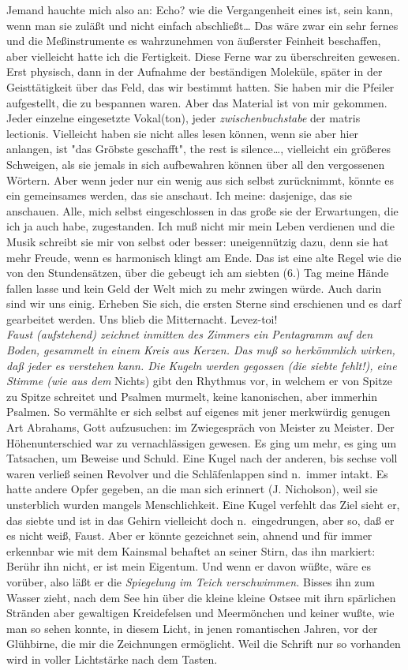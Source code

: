 \documentclass[
]{article}
\begin{document}
Jemand hauchte mich also an: Echo? wie die Vergangenheit eines ist, sein
kann, wenn man sie zuläßt und nicht einfach abschließt\ldots{} Das wäre
zwar ein sehr fernes und die Meßinstrumente es wahrzunehmen von
äußerster Feinheit beschaffen, aber vielleicht hatte ich die Fertigkeit.
Diese Ferne war zu überschreiten gewesen. Erst physisch, dann in der
Aufnahme der beständigen Moleküle, später in der Geisttätigkeit über das
Feld, das wir bestimmt hatten. Sie haben mir die Pfeiler aufgestellt,
die zu bespannen waren. Aber das Material ist von mir gekommen. Jeder
einzelne eingesetzte Vokal(ton), jeder \emph{zwischenbuchstabe} der
matris lectionis. Vielleicht haben sie nicht alles lesen können, wenn
sie aber hier anlangen, ist "das Gröbste geschafft", the rest is
silence\ldots, vielleicht ein größeres Schweigen, als sie jemals in sich
aufbewahren können über all den vergossenen Wörtern. Aber wenn jeder nur
ein wenig aus sich selbst zurücknimmt, könnte es ein gemeinsames werden,
das sie anschaut. Ich meine: dasjenige, das sie anschauen. Alle, mich
selbst eingeschlossen in das große sie der Erwartungen, die ich ja auch
habe, zugestanden. Ich muß nicht mir mein Leben verdienen und die Musik
schreibt sie mir von selbst oder besser: uneigennützig dazu, denn sie
hat mehr Freude, wenn es harmonisch klingt am Ende. Das ist eine alte
Regel wie die von den Stundensätzen, über die gebeugt ich am siebten
(6.) Tag meine Hände fallen lasse und kein Geld der Welt mich zu mehr
zwingen würde. Auch darin sind wir uns einig. Erheben Sie sich, die
ersten Sterne sind erschienen und es darf gearbeitet werden. Uns blieb
die Mitternacht. Levez-toi!\\
\emph{Faust (aufstehend) zeichnet inmitten des Zimmers ein Pentagramm
auf den Boden, gesammelt in einem Kreis aus Kerzen. Das muß so
herkömmlich wirken, daß jeder es verstehen kann. Die Kugeln werden
gegossen (die siebte fehlt!), eine Stimme (wie aus dem }Nichts) gibt den
Rhythmus vor, in welchem er von Spitze zu Spitze schreitet und Psalmen
murmelt, keine kanonischen, aber immerhin Psalmen. So vermählte er sich
selbst auf eigenes mit jener merkwürdig genugen Art Abrahams, Gott
aufzusuchen: im Zwiegespräch von Meister zu Meister. Der
Höhenunterschied war zu vernachlässigen gewesen. Es ging um mehr, es
ging um Tatsachen, um Beweise und Schuld. Eine Kugel nach der anderen,
bis sechse voll waren verließ seinen Revolver und die Schläfenlappen
sind n.~immer intakt. Es hatte andere Opfer gegeben, an die man sich
erinnert (J. Nicholson), weil sie unsterblich wurden mangels
Menschlichkeit. Eine Kugel verfehlt das Ziel sieht er, das siebte und
ist in das Gehirn vielleicht doch n.~eingedrungen, aber so, daß er es
nicht weiß, Faust. Aber er könnte gezeichnet sein, ahnend und für immer
erkennbar wie mit dem Kainsmal behaftet an seiner Stirn, das ihn
markiert: Berühr ihn nicht, er ist mein Eigentum. Und wenn er davon
wüßte, wäre es vorüber, also läßt er die \emph{Spiegelung im Teich
verschwimmen.} Bisses ihn zum Wasser zieht, nach dem See hin über die
kleine kleine Ostsee mit ihrn spärlichen Stränden aber gewaltigen
Kreidefelsen und Meermönchen und keiner wußte, wie man so sehen konnte,
in diesem Licht, in jenen romantischen Jahren, vor der Glühbirne, die
mir die Zeichnungen ermöglicht. Weil die Schrift nur so vorhanden wird
in voller Lichtstärke nach dem Tasten.
\end{document}
